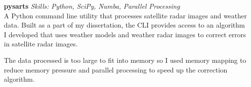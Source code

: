 \textbf{pysarts}  \newline
\textit{Skills: Python, SciPy, Numba, Parallel Processing}\\
A Python command line utility that processes satellite radar images and weather
data. Built as a part of my dissertation, the CLI provides access to an
algorithm I developed that uses weather models and weather radar images to
correct errors in satellite radar images.

The data processed is too large to fit into memory so I used memory mapping to
reduce memory pressure and parallel processing to speed up the correction
algorithm.

